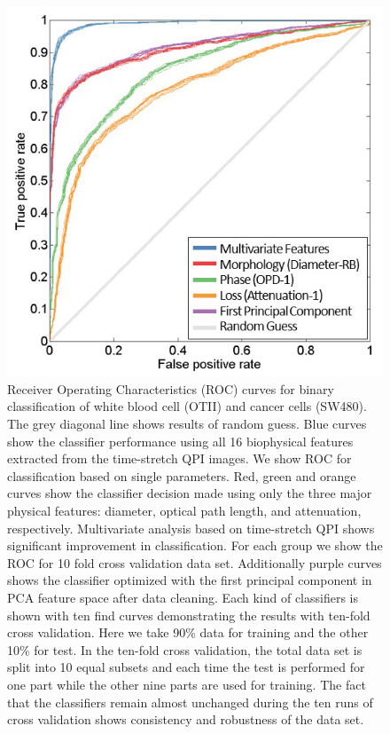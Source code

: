\documentclass[aps,pra,preprint,superscriptaddress]{revtex4-1}
\begin{document}
\begin{figure}
\includegraphics[scale=0.6]{FigureOTSWROC.jpg}
\caption{\label{fig:OTSWROC} Receiver Operating Characteristics (ROC) curves for binary classification of white blood cell (OTII) and cancer cells (SW480). The grey diagonal line shows results of random guess. Blue curves show the classifier performance using all 16 biophysical features extracted from the time-stretch QPI images. 
We show ROC for classification based on single parameters. Red, green and orange curves show the classifier decision made using only the three major physical features: diameter, optical path length, and attenuation, respectively. Multivariate analysis based on time-stretch QPI shows significant improvement in classification. For each group we show the ROC for 10 fold cross validation data set. Additionally purple curves shows the classifier optimized with the first principal component in PCA feature space after data cleaning. Each kind of classifiers is shown with ten find curves demonstrating the results with ten-fold cross validation. Here we take 90\% data for training and the other 10\% for test. In the ten-fold cross validation, the total data set is split into 10 equal subsets and each time the test is performed for one part while the other nine parts are used for training. The fact that the classifiers remain almost unchanged during the ten runs of cross validation shows consistency and robustness of the data set.}
\end{figure}
\end{document}
